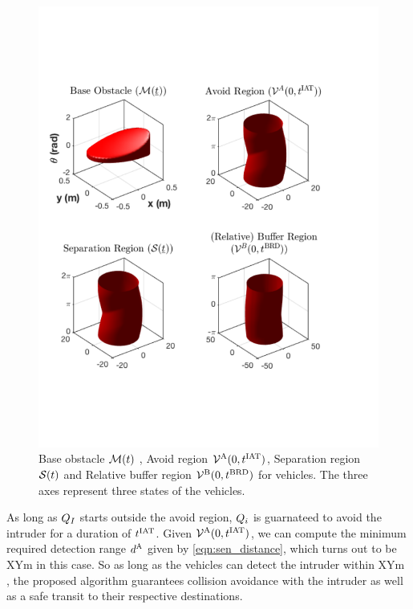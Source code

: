 \begin{figure}[H]
  \centering
  \includegraphics[width=\columnwidth]{"figs/bufferRegion_steps"}
  \caption{Base obstacle $\mathcal{M}(t)$ , Avoid region $\mathcal{V}^{\text{A}}(0, t^\text{IAT})$, Separation region $\mathcal{S}(t)$ and Relative buffer region $\mathcal{V}^{\text{B}}(0, t^\text{BRD})$ for vehicles. The three axes represent three states of the vehicles.}
  \label{fig:MaxMin}
\end{figure}
As long as $Q_{I}$ starts outside the avoid region, $Q_i$ is guarnateed to avoid the intruder for a duration of $t^\text{IAT}$. Given $\mathcal{V}^{\text{A}}(0, t^\text{IAT})$, we can compute the minimum required detection range $d^\text{A}$ given by \eqref{eqn:sen_distance}, which turns out to be XYm  in this case. So as long as the vehicles can detect the intruder within XYm , the proposed algorithm guarantees collision avoidance with the intruder as well as a safe transit to their respective destinations.   

